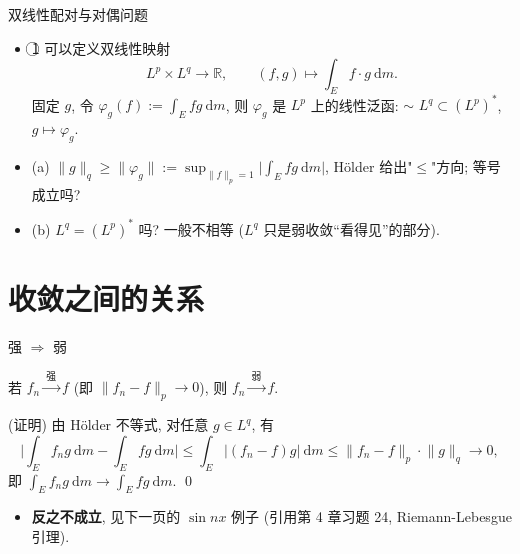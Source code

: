 
\begin{frame}{双线性配对与对偶问题}

\begin{itemize}
\item \textcircled{1} 可以定义\alert{双线性映射}
  \[
  L^p \times L^q \longrightarrow \mathbb{R},
  \qquad
  (f, g) \longmapsto \int_E f \cdot g ~ \mathrm{d} m .
  \]
  固定 $g$, 令 $\varphi_g(f) := \int_E f g ~ \mathrm{d} m$,
  则 $\varphi_g$ 是 $L^p$ 上的线性泛函:
  $\sim$ $L^q \subset (L^p)^*$, $g \mapsto \varphi_g$.
\end{itemize}

\pause

\begin{question}
\begin{itemize}
\item (a) $\lVert g \rVert_q \geqslant \lVert \varphi_g \rVert
  := \sup_{\lVert f \rVert_p = 1} \Big| \int_E f g ~ \mathrm{d} m \Big|$, Hölder 给出"$\leqslant$"方向; \alert{等号}成立吗?
\item (b) $L^q = (L^p)^*$ 吗? 一般\alert{不}相等
  ($L^q$ 只是弱收敛``看得见''的部分).
\end{itemize}
\end{question}

\end{frame}


\section[收敛关系]{收敛之间的关系}


\begin{frame}{强 $\Longrightarrow$ 弱}

\begin{prop}
若 $f_n \xrightarrow{\ \text{强}\ } f$ (即 $\lVert f_n - f \rVert_p \to 0$),
则 $f_n \xrightarrow{\ \text{弱}\ } f$.
\end{prop}

\startproof[bg=yellow, fg=red](证明)
由 Hölder 不等式, 对任意 $g \in L^q$, 有
\[
\Big| \int_E f_n g ~ \mathrm{d} m - \int_E f g ~ \mathrm{d} m \Big|
\leqslant \int_E |(f_n - f) g| ~ \mathrm{d} m
\leqslant \lVert f_n - f \rVert_p \cdot \lVert g \rVert_q
\longrightarrow 0 ,
\]
即 $\int_E f_n g ~ \mathrm{d} m \to \int_E f g ~ \mathrm{d} m$.
\qed

\pause

\begin{itemize}
\item \textbf{反之不成立}, 见下一页的 $\sin nx$ 例子
  (引用第 4 章习题 24, Riemann-Lebesgue 引理).
\end{itemize}

\end{frame}

